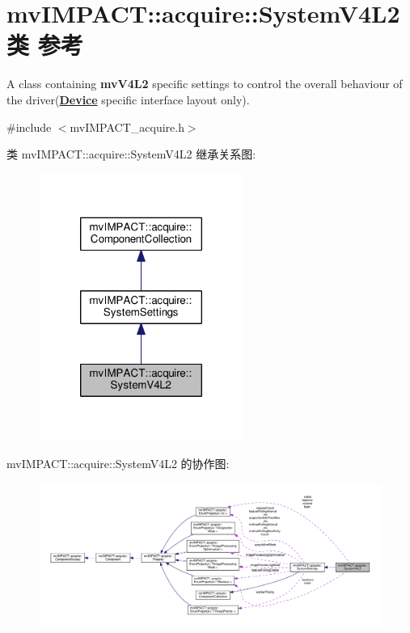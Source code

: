 \hypertarget{classmv_i_m_p_a_c_t_1_1acquire_1_1_system_v4_l2}{\section{mv\+I\+M\+P\+A\+C\+T\+:\+:acquire\+:\+:System\+V4\+L2类 参考}
\label{classmv_i_m_p_a_c_t_1_1acquire_1_1_system_v4_l2}
}


A class containing {\bfseries mv\+V4\+L2} specific settings to control the overall behaviour of the driver({\bfseries \hyperlink{classmv_i_m_p_a_c_t_1_1acquire_1_1_device}{Device}} specific interface layout only).  




{\ttfamily \#include $<$mv\+I\+M\+P\+A\+C\+T\+\_\+acquire.\+h$>$}



类 mv\+I\+M\+P\+A\+C\+T\+:\+:acquire\+:\+:System\+V4\+L2 继承关系图\+:
\nopagebreak
\begin{figure}[H]
\begin{center}
\leavevmode
\includegraphics[width=190pt]{classmv_i_m_p_a_c_t_1_1acquire_1_1_system_v4_l2__inherit__graph}
\end{center}
\end{figure}


mv\+I\+M\+P\+A\+C\+T\+:\+:acquire\+:\+:System\+V4\+L2 的协作图\+:
\nopagebreak
\begin{figure}[H]
\begin{center}
\leavevmode
\includegraphics[width=350pt]{classmv_i_m_p_a_c_t_1_1acquire_1_1_system_v4_l2__coll__graph}
\end{center}
\end{figure}
